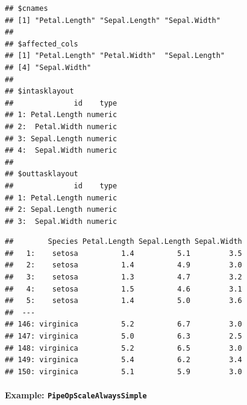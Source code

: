 \documentclass[]{article}
\newenvironment{Shaded}{\begin{snugshade}}{\end{snugshade}}
\newcommand{\DecValTok}[1]{\textcolor[rgb]{0.00,0.00,0.81}{#1}}
\newcommand{\KeywordTok}[1]{\textcolor[rgb]{0.13,0.29,0.53}{\textbf{#1}}}
\newcommand{\NormalTok}[1]{#1}
\newcommand{\OperatorTok}[1]{\textcolor[rgb]{0.81,0.36,0.00}{\textbf{#1}}}
\newcommand{\StringTok}[1]{\textcolor[rgb]{0.31,0.60,0.02}{#1}}
\let\oldparagraph\paragraph
\renewcommand{\paragraph}[1]{\oldparagraph{#1}\mbox{}}
\renewenvironment{Shaded} {\begin{snugshade}\small} {\end{snugshade}}
\begin{document}
\begin{Shaded}
\end{Shaded}

\begin{verbatim}
## $cnames
## [1] "Petal.Length" "Sepal.Length" "Sepal.Width" 
## 
## $affected_cols
## [1] "Petal.Length" "Petal.Width"  "Sepal.Length"
## [4] "Sepal.Width" 
## 
## $intasklayout
##              id    type
## 1: Petal.Length numeric
## 2:  Petal.Width numeric
## 3: Sepal.Length numeric
## 4:  Sepal.Width numeric
## 
## $outtasklayout
##              id    type
## 1: Petal.Length numeric
## 2: Sepal.Length numeric
## 3:  Sepal.Width numeric
\end{verbatim}

\begin{Shaded}
\end{Shaded}

\begin{verbatim}
##        Species Petal.Length Sepal.Length Sepal.Width
##   1:    setosa          1.4          5.1         3.5
##   2:    setosa          1.4          4.9         3.0
##   3:    setosa          1.3          4.7         3.2
##   4:    setosa          1.5          4.6         3.1
##   5:    setosa          1.4          5.0         3.6
##  ---                                                
## 146: virginica          5.2          6.7         3.0
## 147: virginica          5.0          6.3         2.5
## 148: virginica          5.2          6.5         3.0
## 149: virginica          5.4          6.2         3.4
## 150: virginica          5.1          5.9         3.0
\end{verbatim}

\hypertarget{example-pipeopscalealwayssimple}{%
\paragraph{\texorpdfstring{Example: \texttt{PipeOpScaleAlwaysSimple}}{Example: PipeOpScaleAlwaysSimple}}\label{example-pipeopscalealwayssimple}}
\end{document}
